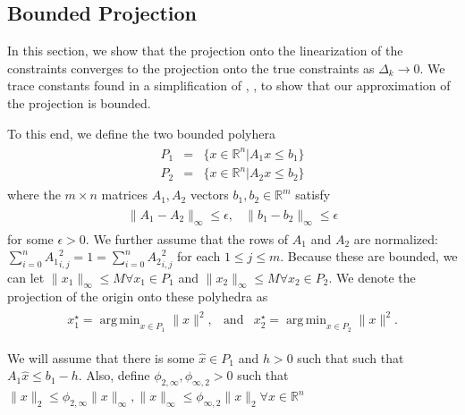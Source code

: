 \documentclass{article}
\theoremstyle{case}
\newcommand{\Rn}{\mathbb R^n}
\newcommand{\Rm}{\mathbb R^m}
\newcommand{\dk}{\Delta_k}
\DeclareMathOperator*{\argmin}{arg\,min}
\begin{document}
\subsection{Bounded Projection}

In this section, we show that the projection onto the linearization of the constraints converges to the projection onto the true constraints as $\dk \to 0$.
We trace constants found in a simplification of \cite{dummy:hoffman}, \cite{dummy:continuity_of_inverse}, \cite{dummy:perturbations} to show that our approximation of the projection is bounded.

To this end, we define the two bounded polyhera
\begin{align*}
\begin{array}{ccc}
P_1 &=& \{ x \in \Rn | A_1x\le b_1 \} \\
P_2 &=& \{ x \in \Rn | A_2x\le b_2 \}
\end{array}
\end{align*}
where the $m\times n$ matrices $A_1, A_2$ vectors $b_1, b_2 \in \Rm$  satisfy
\begin{align*}
\begin{array}{cc}
\|A_1 - A_2\|_{\infty} \le \epsilon, & \|b_1 - b_2\|_{\infty} \le \epsilon
\end{array}
\end{align*}
for some $\epsilon > 0$.
We further assume that the rows of $A_1$ and $A_2$ are normalized: $\sum_{i = 0}^n{A_1}_{i,j}^2 = 1 = \sum_{i = 0}^n{A_2}_{i,j}^2$ for each $1 \le j \le m$.
Because these are bounded, we can let $\|x_1\|_{\infty} \le M \forall x_1 \in P_1$ and $\|x_2\|_{\infty} \le M \forall x_2 \in P_2$.
We denote the projection of the origin onto these polyhedra as
\begin{align*}
\begin{array}{ccc}
x_1^{\star} = \argmin_{x\in P_1}\|x\|^2, &\textrm{and} & x_2^{\star} = \argmin_{x\in P_2}\|x\|^2.
\end{array}
\end{align*}

We will assume that there is some $\hat x \in P_1$ and $h > 0$ such that such that $A_1 \hat x \le b_1 - h$.
Also, define $\phi_{2,\infty},\phi_{\infty,2}>0$ such that $\|x\|_2 \le \phi_{2, \infty}\|x\|_{\infty}, \|x\|_{\infty} \le \phi_{\infty,2}\|x\|_2\forall x \in \Rn$

% 
\end{document}

